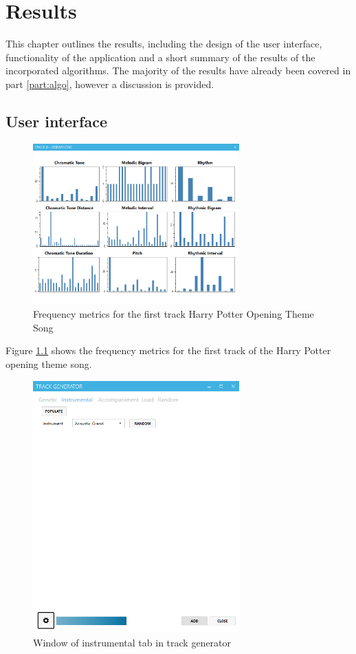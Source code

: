 

\chapter{Results}
This chapter outlines the results, including the design of the user interface, functionality of the application and a short summary of the results of the incorporated algorithms.
The majority of the results have already been covered in part \ref{part:algo}, however a discussion is provided.

\section{User interface}

\begin{figure}
\centerline{\includegraphics[width=300px]{../images/res_ui_metrics_harry_t0.png}}
\caption{Frequency metrics for the first track Harry Potter Opening Theme Song}
\label{ims:metricsharryt0}
\end{figure}

Figure \ref{ims:metricsharryt0} shows the frequency metrics for the first track of the Harry Potter opening theme song.

\begin{figure}
\centerline{\includegraphics[width=300px]{../images/res_ui_track_generator_instr.png}}
\caption{Window of instrumental tab in track generator}
\label{ims:uitrackgeninstr}
\end{figure}


